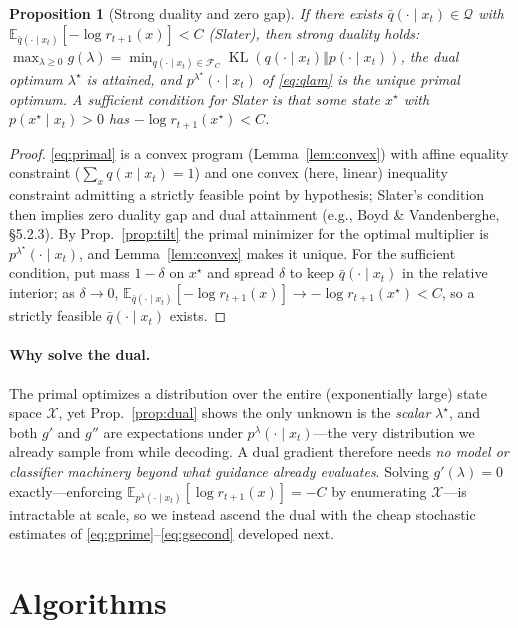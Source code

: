 \documentclass{article}
\newtheorem{proposition}{Proposition}
\DeclareMathOperator{\KL}{KL}
\newcommand{\E}{\mathbb{E}}
\newcommand{\X}{\mathcal{X}}
\newcommand{\Q}{\mathcal{Q}}
\newcommand{\lstar}{\lambda^{\star}}
\newcommand{\qlam}{p^{\lambda}(\cdot\mid x_t)}
\begin{document}
\begin{proposition}[Strong duality and zero gap]
\label{prop:strongduality}
If there exists $\bar q(\cdot\mid x_t)\in\Q$ with $\E_{\bar q(\cdot\mid x_t)}[-\log r_{t+1}(x)]<C$ (Slater), then strong duality holds: $\max_{\lambda\ge0}g(\lambda)=\min_{q(\cdot\mid x_t)\in\mathcal F_C}\KL(q(\cdot\mid x_t)\Vert p(\cdot\mid x_t))$, the dual optimum $\lstar$ is attained, and $p^{\lstar}(\cdot\mid x_t)$ of \eqref{eq:qlam} is the unique primal optimum. A sufficient condition for Slater is that some state $x^\star$ with $p(x^\star\mid x_t)>0$ has $-\log r_{t+1}(x^\star)<C$.
\end{proposition}
\begin{proof}
\eqref{eq:primal} is a convex program (Lemma~\ref{lem:convex}) with affine equality constraint ($\sum_x q(x\mid x_t)=1$) and one convex (here, linear) inequality constraint admitting a strictly feasible point by hypothesis; Slater's condition then implies zero duality gap and dual attainment (e.g., Boyd \& Vandenberghe, \S5.2.3). By Prop.~\ref{prop:tilt} the primal minimizer for the optimal multiplier is $p^{\lstar}(\cdot\mid x_t)$, and Lemma~\ref{lem:convex} makes it unique. For the sufficient condition, put mass $1-\delta$ on $x^\star$ and spread $\delta$ to keep $\bar q(\cdot\mid x_t)$ in the relative interior; as $\delta\to0$, $\E_{\bar q(\cdot\mid x_t)}[-\log r_{t+1}(x)]\to -\log r_{t+1}(x^\star)<C$, so a strictly feasible $\bar q(\cdot\mid x_t)$ exists.
\end{proof}

\paragraph{Why solve the dual.} The primal optimizes a distribution over the entire (exponentially large) state space $\X$, yet Prop.~\ref{prop:dual} shows the only unknown is the \emph{scalar} $\lstar$, and both $g'$ and $g''$ are expectations under $\qlam$---the very distribution we already sample from while decoding. A dual gradient therefore needs \emph{no model or classifier machinery beyond what guidance already evaluates}. Solving $g'(\lambda)=0$ exactly---enforcing $\E_{p^{\lambda}(\cdot\mid x_t)}[\log r_{t+1}(x)]=-C$ by enumerating $\X$---is intractable at scale, so we instead ascend the dual with the cheap stochastic estimates of \eqref{eq:gprime}--\eqref{eq:gsecond} developed next.

\section{Algorithms}
\label{sec:algorithms}
\end{document}
